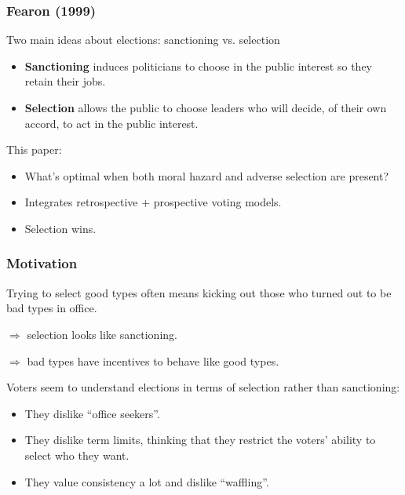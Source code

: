 \documentclass[10pt]{beamer}
\begin{document}
\begin{frame}

\frametitle{Fearon (1999)}

Two main ideas about elections: sanctioning vs. selection

\pause 

\begin{itemize}
\item \textbf{Sanctioning} induces politicians to choose in the public interest so they retain their jobs. 
\item \textbf{Selection} allows the public to choose leaders who will decide, of their own accord, to act in the public interest. 
\end{itemize}

\bigskip

This paper: 
\begin{itemize}
\item What's optimal when both moral hazard and adverse selection are present?
\item Integrates retrospective + prospective voting models.
\item Selection wins.
\end{itemize}

\end{frame}


\begin{frame}

\frametitle{Motivation}

Trying to select good types often means kicking out those who turned out to be bad types in office.

$\Rightarrow$ selection looks like sanctioning.

$\Rightarrow$ bad types have incentives to behave like good types. %

\bigskip

Voters seem to understand elections in terms of selection rather than sanctioning: 
\begin{itemize}
\item They dislike ``office seekers''.
\item They dislike term limits, thinking that they restrict the voters' ability to select who they want.
\item They value consistency a lot and dislike ``waffling''.
\end{itemize}

\end{frame}
\end{document}
